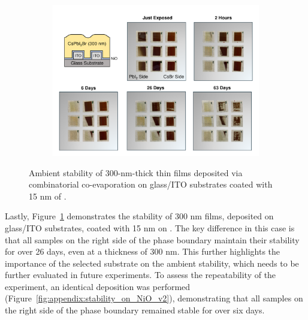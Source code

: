 \begin{figure}[htbp]
    \centering
    \begin{subfigure}[t]{0.99\textwidth}
        \centering
        \includegraphics[width=\textwidth]{chapters/stability/imeges/Stability_No_Rotation_275_on_nio.pdf} %
    \end{subfigure}

    \caption[Ambient stability of 300-nm-thick  thin films deposited via combinatorial co-evaporation on glass/ITO substrates coated with 15 nm of .]{Ambient stability of 300-nm-thick  thin films deposited via combinatorial co-evaporation on glass/ITO substrates coated with 15 nm of .}
    \label{fig:stability:no_rotation:300nm_ito_nio}
\end{figure}


Lastly, Figure~\ref{fig:stability:no_rotation:300nm_ito_nio} demonstrates the stability of 300 nm  films, deposited on glass/ITO substrates, coated with 15 nm on . The key difference in this case is that all samples on the right side of the phase boundary maintain their stability for over 26 days, even at a thickness of 300 nm. This further highlights the importance of the selected substrate on the ambient stability, which needs to be further evaluated in future experiments. To assess the repeatability of the experiment, an identical deposition was performed (Figure~\ref{fig:appendix:stability_on_NiO_v2}), demonstrating that all samples on the right side of the phase boundary remained stable for over six days. 

